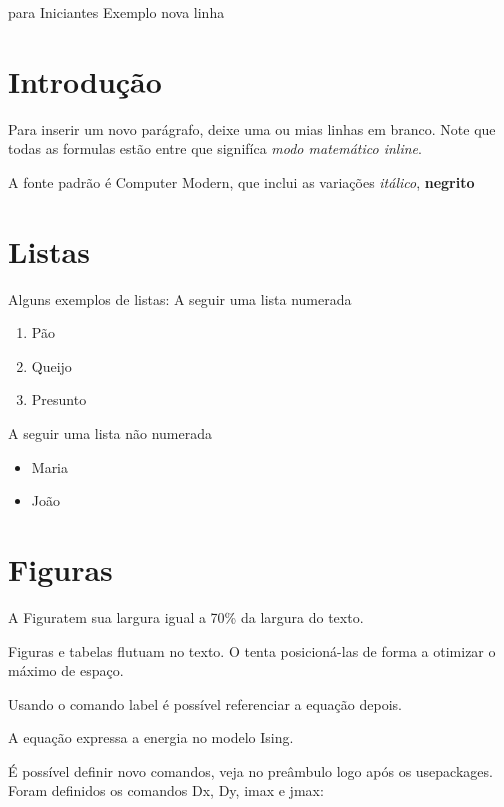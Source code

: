 \documentclass[portuguese,brazilian,12pt,final]{article}
\begin{document}
{para Iniciantes Exemplo} nova linha

\section{Introdução}

Para inserir um novo parágrafo, deixe uma ou mias linhas em branco.
Note que todas as formulas estão entre
que signifíca \textit{modo matemático inline}.

A fonte padrão é Computer Modern, que inclui as variações \textit{itálico},
\textbf{negrito}

\section{Listas}

Alguns exemplos de listas: A seguir uma lista numerada

\begin{enumerate}
\item Pão
\item Queijo
\item Presunto
\end{enumerate}

A seguir uma lista não numerada

\begin{itemize}
\item Maria
\item João
\end{itemize}

\section{Figuras}


A Figuratem sua largura igual a 70\% da largura do texto.

Figuras e tabelas flutuam no texto. O tenta posicioná-las de forma a otimizar o máximo de espaço.

Usando o comando label é possível referenciar a equação depois.

A equação expressa a energia no modelo Ising.

É possível definir novo comandos, veja no preâmbulo logo após os usepackages. Foram definidos os comandos Dx, Dy, imax e jmax:
\end{document}
